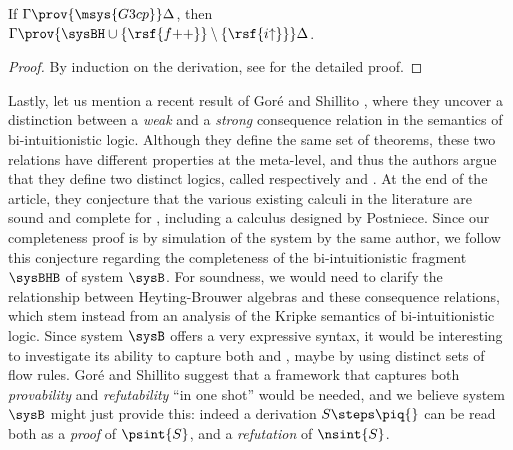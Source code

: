 \begin{lemma}
  If $\Gamma \prov{\msys{G3cp}} \Delta$, then $\Gamma \prov{\sysBH \cup
  \{\rsf{f{+}{+}}\} \setminus \{\rsf{i{\uparrow}}\}} \Delta$.
\end{lemma}
\begin{proof}
  By induction on the  derivation, see
   for the detailed proof.
\end{proof}

Lastly, let us mention a recent result of Goré and Shillito
\cite{gore_bi-intuitionistic_2020}, where they uncover a distinction between a
\emph{weak} and a \emph{strong} consequence relation in the semantics of
bi-intuitionistic logic. Although they define the same set of theorems, these
two relations have different properties at the meta-level, and thus the authors
argue that they define two distinct logics, called respectively  and
. At the end of the article, they conjecture that the various existing
calculi in the literature are sound and complete for , including a
calculus designed by Postniece. Since our completeness proof is by simulation of
the system  by the same author, we follow this conjecture regarding
the completeness of the bi-intuitionistic fragment $\sysBHB$ of system $\sysB$.
For soundness, we would need to clarify the relationship between Heyting-Brouwer
algebras and these consequence relations, which stem instead from an analysis of
the Kripke semantics of bi-intuitionistic logic. Since system $\sysB$ offers a
very expressive syntax, it would be interesting to investigate its ability to
capture both  and , maybe by using distinct sets of flow
rules. Goré and Shillito suggest that a framework that captures both
\emph{provability} and \emph{refutability} ``in one shot'' would be needed, and
we believe system $\sysB$ might just provide this: indeed a derivation $S \steps
\piq{}$ can be read both as a \emph{proof} of $\psint{S}$, and a
\emph{refutation} of $\nsint{S}$.
